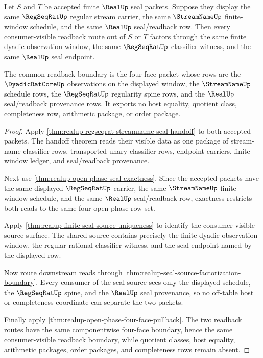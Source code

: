 \begin{theorem}
\label{thm:realup-regseqrat-seal-readback-determinacy}
Let $S$ and $T$ be accepted finite $\RealUp$ seal packets. Suppose they display
the same $\RegSeqRatUp$ regular stream carrier, the same $\StreamNameUp$
finite-window schedule, and the same $\RealUp$ seal/readback row. Then every
consumer-visible readback route out of $S$ or $T$ factors through the same
finite dyadic observation window, the same $\RegSeqRatUp$ classifier witness,
and the same $\RealUp$ seal endpoint.

The common readback boundary is the four-face packet whose rows are the
$\DyadicRatCoreUp$ observations on the displayed window, the $\StreamNameUp$
schedule rows, the $\RegSeqRatUp$ regularity spine rows, and the $\RealUp$
seal/readback provenance rows. It exports no host equality, quotient class,
completeness row, arithmetic package, or order package.
\end{theorem}
\begin{proof}
Apply \autoref{thm:realup-regseqrat-streamname-seal-handoff} to both accepted
packets. The handoff theorem reads their visible data as one package of
stream-name classifier rows, transported unary classifier rows, endpoint
carriers, finite-window ledger, and seal/readback provenance.

Next use \autoref{thm:realup-open-phase-seal-exactness}. Since the accepted
packets have the same displayed $\RegSeqRatUp$ carrier, the same
$\StreamNameUp$ finite-window schedule, and the same $\RealUp$ seal/readback
row, exactness restricts both reads to the same four open-phase row set.

Apply \autoref{thm:realup-finite-seal-source-uniqueness} to identify the
consumer-visible source surface. The shared source contains precisely the
finite dyadic observation window, the regular-rational classifier witness, and
the seal endpoint named by the displayed row.

Now route downstream reads through
\autoref{thm:realup-seal-source-factorization-boundary}. Every consumer of the
seal source sees only the displayed schedule, the $\RegSeqRatUp$ spine, and the
$\RealUp$ seal provenance, so no off-table host or completeness coordinate can
separate the two packets.

Finally apply \autoref{thm:realup-open-phase-four-face-pullback}. The two
readback routes have the same componentwise four-face boundary, hence the same
consumer-visible readback boundary, while quotient classes, host equality,
arithmetic packages, order packages, and completeness rows remain absent.
\end{proof}

